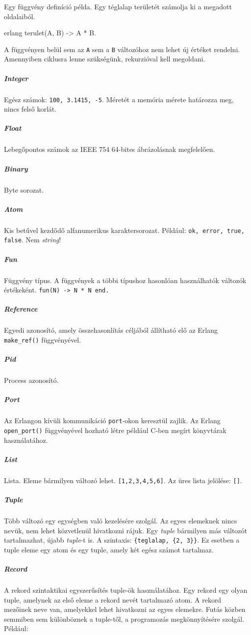\documentclass[12pt, a4paper, oneside]{book}
\begin{document}
Egy függvény definíció példa. Egy téglalap területét számolja ki a megadott
oldalaiból.

\begin{code}{erlang}{}
terulet(A, B) -> 
  A * B.
\end{code}

A függvényen belül sem az \texttt{A} sem a \texttt{B} változóhoz nem lehet új
értéket rendelni. Amennyiben ciklusra lenne szükségünk, rekurzióval
kell megoldani.

\subparagraph{Integer} Egész számok: \texttt{100, 3.1415, -5}. Méretét a
memória mérete határozza meg, nincs felső korlát.

\subparagraph{Float} Lebegőpontos számok az IEEE 754 64-bites ábrázolásnak
megfelelően.

\subparagraph{Binary} Byte sorozat.

\subparagraph{Atom} Kis betűvel kezdődő alfanumerikus karaktersorozat. Például:
\texttt{ok, error, true, false}. Nem \emph{string}!

\subparagraph{Fun} Függvény típus. A függvények a többi típushoz hasonlóan
használhatók változók értékeként. \texttt{fun(N) -> N * N  end.}

\subparagraph{Reference} Egyedi azonosító, amely összehasonlítás céljából
állítható elő az Erlang \texttt{make\_ref()} függvényével.

\subparagraph{Pid} Process azonosító.

\subparagraph{Port} Az Erlangon kívüli kommunikáció \texttt{port}-okon
keresztül zajlik. Az Erlang \texttt{open\_port()} függvényével hozható létre
például C-ben megírt könyvtárak használatához.

\subparagraph{List} Lista. Eleme bármilyen változó lehet.
\texttt{[1,2,3,4,5,6]}. Az üres lista jelölése: \texttt{[]}.

\subparagraph{Tuple} Több változó egy egységben való kezelésére szolgál. Az
egyes elemeknek nincs nevük, nem lehet közvetlenül hivatkozni rájuk. Egy
\emph{tuple} bármilyen más változót tartalmazhat, újabb \emph{tuple}-t is. A
szintaxis: \texttt{\{teglalap, \{2, 3\}\}}. Ez esetben a tuple eleme egy atom
és egy tuple, amely két egész számot tartalmaz.

\subparagraph{Record} A rekord szintaktikai egyszerűsítés tuple-ök
használatához. Egy rekord egy olyan tuple, amelynek az első eleme a rekord
nevét tartalmazó atom. A rekord mezőinek neve van, amelyekkel lehet hivatkozni
az egyes elemekre. Futás közben semmiben sem különböznek a tuple-től, a
programozás megkönnyítésére szolgál. Például:
\end{document}

